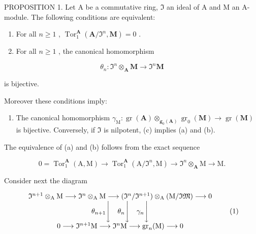 PROPOSITION 1. Let A be a commutative ring, \(\mathfrak{I}\) an ideal of A and M an A-module. The following conditions are equivalent:

\begin{enumerate}
\def\labelenumi{(\alph{enumi})}
\item
  For all \(n \geqslant 1\) , \(\operatorname{Tor}_1^{\mathbf{A}}(\mathbf{A}/\mathfrak{I}^n, \mathbf{M}) = 0\) .
\item
  For all \(n \geqslant 1\) , the canonical homomorphism
\end{enumerate}

\[
\theta_ {n} \colon \mathfrak {I} ^ {n} \otimes_ {\mathbf {A}} \mathbf {M} \rightarrow \mathfrak {I} ^ {n} \mathbf {M}
\]

is bijective.

Moreover these conditions imply:

\begin{enumerate}
\def\labelenumi{(\alph{enumi})}
\setcounter{enumi}{2}
\tightlist
\item
  The canonical homomorphism \(\gamma_{\mathrm{M}}: \operatorname{gr}(\mathbf{A}) \otimes_{\mathbf{g}_{0}(\mathbf{A})} \operatorname{gr}_{0}(\mathbf{M}) \to \operatorname{gr}(\mathbf{M})\) is bijective. Conversely, if \(\Im\) is nilpotent, (c) implies (a) and (b).
\end{enumerate}

The equivalence of (a) and (b) follows from the exact sequence

\[
0 = \operatorname{Tor} _ {1} ^ {\mathbf {A}} (\mathrm{A}, \mathrm{M}) \rightarrow \operatorname{Tor} _ {1} ^ {\mathbf {A}} (\mathrm{A} / \Im^ {n}, \mathrm{M}) \rightarrow \Im^ {n} \otimes_ {\mathbf {A}} \mathrm{M} \rightarrow \mathrm{M}.
\]

Consider next the diagram

\[
\begin{array}{c} \mathfrak {I} ^ {n + 1} \otimes_ {\mathrm{A}} \mathrm{M} \longrightarrow \mathfrak {I} ^ {n} \otimes_ {\mathrm{A}} \mathrm{M} \longrightarrow (\mathfrak {I} ^ {n} / \mathfrak {I} ^ {n + 1}) \otimes_ {\mathrm{A}} (\mathrm{M} / \mathfrak {I M}) \longrightarrow 0 \\ \theta_ {n + 1} \Bigg \downarrow \quad \theta_ {n} \Bigg \downarrow \quad \gamma_ {n} \Bigg \downarrow \\ 0 \longrightarrow \mathfrak {I} ^ {n + 1} \mathrm{M} \longrightarrow \mathfrak {I} ^ {n} \mathrm{M} \longrightarrow \operatorname{gr} _ {n} (\mathrm{M}) \longrightarrow 0 \end{array}\tag{1}
\]

